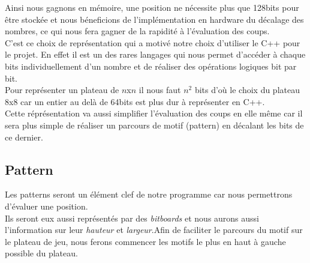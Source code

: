 \documentclass{article}
\begin{document}
Ainsi nous gagnons en mémoire, une position ne nécessite plus que 128bits pour être stockée
et nous béneficions de l'implémentation en hardware du décalage des nombres, ce qui nous fera
gagner de la rapidité à l'évaluation des coups.\\

C'est ce choix de représentation qui a motivé notre choix d'utiliser le C++ pour le projet.
En effet il est un des rares langages qui nous permet d'accéder à chaque bits individuellement
d'un nombre et de réaliser des opérations logiques bit par bit. \\
Pour représenter un plateau de $n$x$n$ il nous faut $n^2$ bits d'où le choix du plateau 8x8
car un entier au delà de 64bits est plus dur à représenter en C++.\\

Cette réprésentation va aussi simplifier l'évaluation des coups en elle même car il sera
plus simple de réaliser un parcours de motif (pattern) en décalant les bits de ce dernier.

\pagebreak
\subsection{Pattern}

Les patterns seront un élément clef de notre programme car nous permettrons d'évaluer une position.\\
Ils seront eux aussi représentés par des \textit{bitboards} et nous aurons aussi l'information sur leur
\textit{hauteur} et \textit{largeur}.Afin de faciliter le parcours du motif sur le plateau de jeu, nous
ferons commencer les motifs le plus en haut à gauche possible du plateau.
\end{document}

